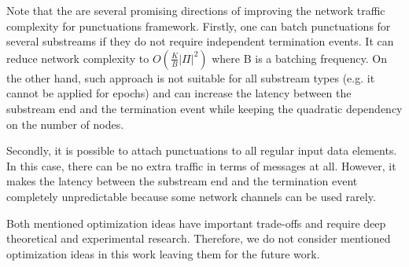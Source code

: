 Note that the are several promising directions of improving the network traffic complexity for punctuations framework. Firstly, one can batch punctuations for several substreams if they do not require independent termination events. It can reduce network complexity to $O(\frac{K}{B}|\Pi|^2)$ where B is a batching frequency. On the other hand, such approach is not suitable for all substream types (e.g. it cannot be applied for epochs) and can increase the latency between the substream end and the termination event while keeping the quadratic dependency on the number of nodes.

Secondly, it is possible to attach punctuations to all regular input data elements. In this case, there can be no extra traffic in terms of messages at all. However, it makes the latency between the substream end and the termination event completely unpredictable because some network channels can be used rarely.

Both mentioned optimization ideas have important trade-offs and require deep theoretical and experimental research. Therefore, we do not consider mentioned optimization ideas in this work leaving them for the future work.